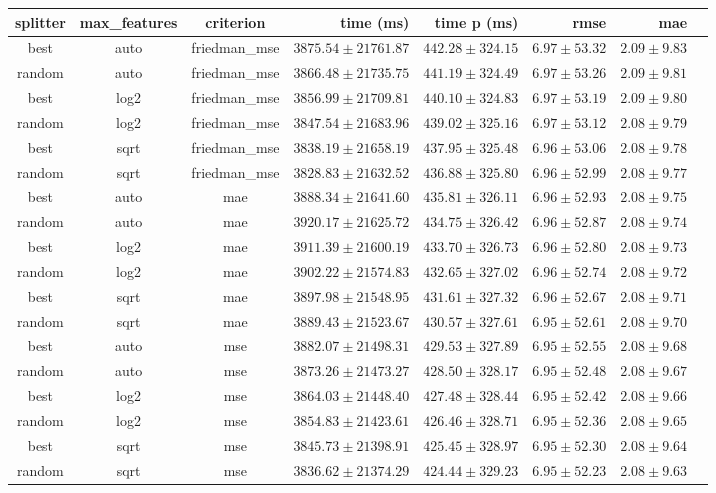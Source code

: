 \begin{tabular}{cccrrrrr}
\toprule
\textbf{splitter} & \textbf{max\_features} & \textbf{criterion} & \textbf{time (ms)} & \textbf{time p (ms)} & \textbf{rmse} & \textbf{mae}\\
\midrule
best & auto & friedman_mse & $3875.54 \pm 21761.87$ & $442.28 \pm 324.15$ & $6.97 \pm 53.32$ & $2.09 \pm 9.83$\\
random & auto & friedman_mse & $3866.48 \pm 21735.75$ & $441.19 \pm 324.49$ & $6.97 \pm 53.26$ & $2.09 \pm 9.81$\\
best & log2 & friedman_mse & $3856.99 \pm 21709.81$ & $440.10 \pm 324.83$ & $6.97 \pm 53.19$ & $2.09 \pm 9.80$\\
random & log2 & friedman_mse & $3847.54 \pm 21683.96$ & $439.02 \pm 325.16$ & $6.97 \pm 53.12$ & $2.08 \pm 9.79$\\
best & sqrt & friedman_mse & $3838.19 \pm 21658.19$ & $437.95 \pm 325.48$ & $6.96 \pm 53.06$ & $2.08 \pm 9.78$\\
random & sqrt & friedman_mse & $3828.83 \pm 21632.52$ & $436.88 \pm 325.80$ & $6.96 \pm 52.99$ & $2.08 \pm 9.77$\\
best & auto & mae & $3888.34 \pm 21641.60$ & $435.81 \pm 326.11$ & $6.96 \pm 52.93$ & $2.08 \pm 9.75$\\
random & auto & mae & $3920.17 \pm 21625.72$ & $434.75 \pm 326.42$ & $6.96 \pm 52.87$ & $2.08 \pm 9.74$\\
best & log2 & mae & $3911.39 \pm 21600.19$ & $433.70 \pm 326.73$ & $6.96 \pm 52.80$ & $2.08 \pm 9.73$\\
random & log2 & mae & $3902.22 \pm 21574.83$ & $432.65 \pm 327.02$ & $6.96 \pm 52.74$ & $2.08 \pm 9.72$\\
best & sqrt & mae & $3897.98 \pm 21548.95$ & $431.61 \pm 327.32$ & $6.96 \pm 52.67$ & $2.08 \pm 9.71$\\
random & sqrt & mae & $3889.43 \pm 21523.67$ & $430.57 \pm 327.61$ & $6.95 \pm 52.61$ & $2.08 \pm 9.70$\\
best & auto & mse & $3882.07 \pm 21498.31$ & $429.53 \pm 327.89$ & $6.95 \pm 52.55$ & $2.08 \pm 9.68$\\
random & auto & mse & $3873.26 \pm 21473.27$ & $428.50 \pm 328.17$ & $6.95 \pm 52.48$ & $2.08 \pm 9.67$\\
best & log2 & mse & $3864.03 \pm 21448.40$ & $427.48 \pm 328.44$ & $6.95 \pm 52.42$ & $2.08 \pm 9.66$\\
random & log2 & mse & $3854.83 \pm 21423.61$ & $426.46 \pm 328.71$ & $6.95 \pm 52.36$ & $2.08 \pm 9.65$\\
best & sqrt & mse & $3845.73 \pm 21398.91$ & $425.45 \pm 328.97$ & $6.95 \pm 52.30$ & $2.08 \pm 9.64$\\
random & sqrt & mse & $3836.62 \pm 21374.29$ & $424.44 \pm 329.23$ & $6.95 \pm 52.23$ & $2.08 \pm 9.63$\\
\bottomrule
\end{tabular}

